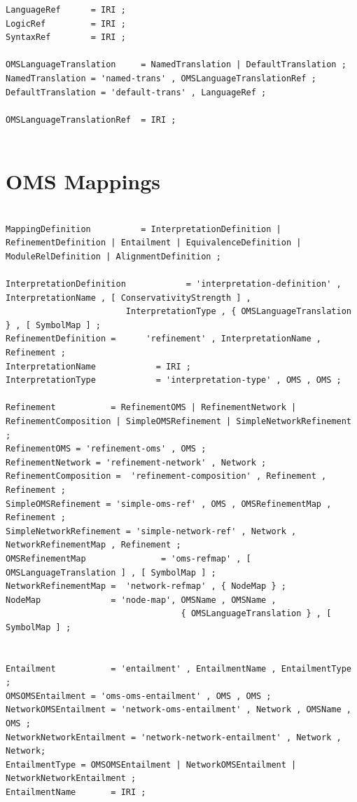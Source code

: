 \documentclass[10pt,fleqn,final]{scrreprt}
\newcommand{\sclause}[1]{\section{#1}}
\newenvironment{definitions}[0]{\medskip }{}
\begin{document}
\begin{definitions}
\begin{lstlisting}[language=ebnf,escapeinside={()}]
LanguageRef      = IRI ;
LogicRef         = IRI ;
SyntaxRef        = IRI ;
                 
OMSLanguageTranslation     = NamedTranslation | DefaultTranslation ;
NamedTranslation = 'named-trans' , OMSLanguageTranslationRef ;
DefaultTranslation = 'default-trans' , LanguageRef ;
                 
OMSLanguageTranslationRef  = IRI ;
                 
\end{lstlisting}



\sclause{OMS Mappings}


\begin{lstlisting}[language=ebnf,escapeinside={<>},mathescape]  % abstract syntax

MappingDefinition          = InterpretationDefinition | RefinementDefinition | Entailment | EquivalenceDefinition | ModuleRelDefinition | AlignmentDefinition ;

InterpretationDefinition            = 'interpretation-definition' , InterpretationName , [ ConservativityStrength ] , 
                        InterpretationType , { OMSLanguageTranslation } , [ SymbolMap ] ;  
RefinementDefinition =      'refinement' , InterpretationName , Refinement ;
InterpretationName            = IRI ;
InterpretationType            = 'interpretation-type' , OMS , OMS ;

Refinement           = RefinementOMS | RefinementNetwork | RefinementComposition | SimpleOMSRefinement | SimpleNetworkRefinement ;
RefinementOMS = 'refinement-oms' , OMS ;
RefinementNetwork = 'refinement-network' , Network ;
RefinementComposition =  'refinement-composition' , Refinement , Refinement ;
SimpleOMSRefinement = 'simple-oms-ref' , OMS , OMSRefinementMap , Refinement ;
SimpleNetworkRefinement = 'simple-network-ref' , Network , NetworkRefinementMap , Refinement ;
OMSRefinementMap               = 'oms-refmap' , [ OMSLanguageTranslation ] , [ SymbolMap ] ;
NetworkRefinementMap =  'network-refmap' , { NodeMap } ;
NodeMap              = 'node-map', OMSName , OMSName , 
                                   { OMSLanguageTranslation } , [ SymbolMap ] ;


Entailment           = 'entailment' , EntailmentName , EntailmentType ;
OMSOMSEntailment = 'oms-oms-entailment' , OMS , OMS ;
NetworkOMSEntailment = 'network-oms-entailment' , Network , OMSName , OMS ;
NetworkNetworkEntailment = 'network-network-entailment' , Network , Network;
EntailmentType = OMSOMSEntailment | NetworkOMSEntailment | NetworkNetworkEntailment ;
EntailmentName       = IRI ;


\end{lstlisting}
\end{definitions}
\end{document}
